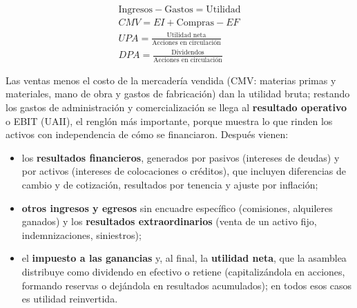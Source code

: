 \begin{formulaBox}
\[
\begin{gathered}
\text{Ingresos} - \text{Gastos} = \text{Utilidad}
\\[4pt]
CMV = EI + \text{Compras} - EF
\\[4pt]
UPA = \frac{\text{Utilidad neta}}{\text{Acciones en circulación}}
\\[4pt]
DPA = \frac{\text{Dividendos}}{\text{Acciones en circulación}}
\end{gathered}
\]
\end{formulaBox}

Las ventas menos el costo de la mercadería vendida (CMV: materias primas y materiales, mano de obra y gastos de fabricación) dan la utilidad bruta; restando los gastos de administración y comercialización se llega al \textbf{resultado operativo} o EBIT (UAII), el renglón más importante, porque muestra lo que rinden los activos con independencia de cómo se financiaron. Después vienen:
\begin{itemize}
\item los \textbf{resultados financieros}, generados por pasivos (intereses de deudas) y por activos (intereses de colocaciones o créditos), que incluyen diferencias de cambio y de cotización, resultados por tenencia y ajuste por inflación;
\item \textbf{otros ingresos y egresos} sin encuadre específico (comisiones, alquileres ganados) y los \textbf{resultados extraordinarios} (venta de un activo fijo, indemnizaciones, siniestros);
\item el \textbf{impuesto a las ganancias} y, al final, la \textbf{utilidad neta}, que la asamblea distribuye como dividendo en efectivo o retiene (capitalizándola en acciones, formando reservas o dejándola en resultados acumulados); en todos esos casos es utilidad reinvertida.
\end{itemize}

